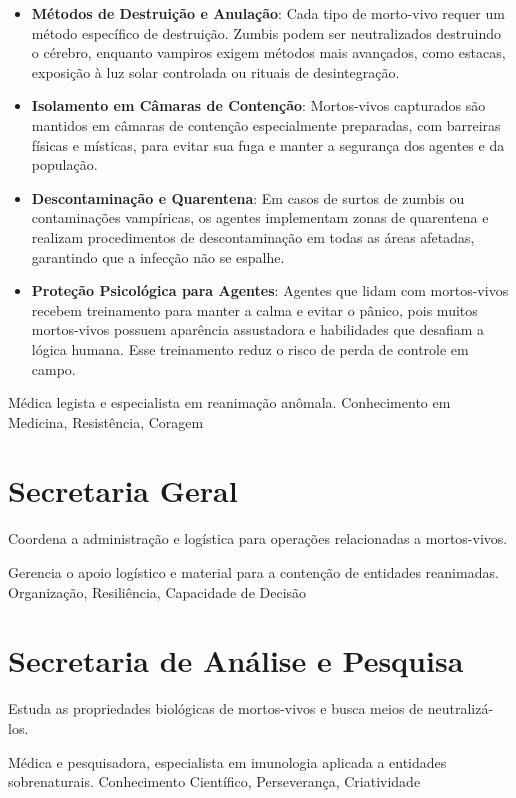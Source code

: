 \begin{itemize}
    \item \textbf{Métodos de Destruição e Anulação}: Cada tipo de morto-vivo requer um método específico de destruição. Zumbis podem ser neutralizados destruindo o cérebro, enquanto vampiros exigem métodos mais avançados, como estacas, exposição à luz solar controlada ou rituais de desintegração.
    \item \textbf{Isolamento em Câmaras de Contenção}: Mortos-vivos capturados são mantidos em câmaras de contenção especialmente preparadas, com barreiras físicas e místicas, para evitar sua fuga e manter a segurança dos agentes e da população.
    \item \textbf{Descontaminação e Quarentena}: Em casos de surtos de zumbis ou contaminações vampíricas, os agentes implementam zonas de quarentena e realizam procedimentos de descontaminação em todas as áreas afetadas, garantindo que a infecção não se espalhe.
    \item \textbf{Proteção Psicológica para Agentes}: Agentes que lidam com mortos-vivos recebem treinamento para manter a calma e evitar o pânico, pois muitos mortos-vivos possuem aparência assustadora e habilidades que desafiam a lógica humana. Esse treinamento reduz o risco de perda de controle em campo.
\end{itemize}




{Médica legista e especialista em reanimação anômala.}
{Conhecimento em Medicina, Resistência, Coragem}

\section{Secretaria Geral}
Coordena a administração e logística para operações relacionadas a mortos-vivos.

{Gerencia o apoio logístico e material para a contenção de entidades reanimadas.}
{Organização, Resiliência, Capacidade de Decisão}

\section{Secretaria de Análise e Pesquisa}
Estuda as propriedades biológicas de mortos-vivos e busca meios de neutralizá-los.

{Médica e pesquisadora, especialista em imunologia aplicada a entidades sobrenaturais.}
{Conhecimento Científico, Perseverança, Criatividade}

